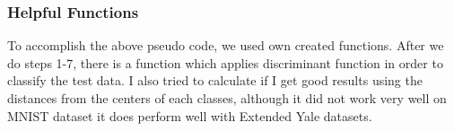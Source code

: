 \subsubsection{Helpful Functions}

To accomplish the above pseudo code, we used own created functions. After we do steps 1-7, there is a function  which applies discriminant function in order to classify the test data. I also tried to calculate if I get good results using the distances from the centers of each classes, although it did not work very well on MNIST dataset it does perform well with Extended Yale datasets.
